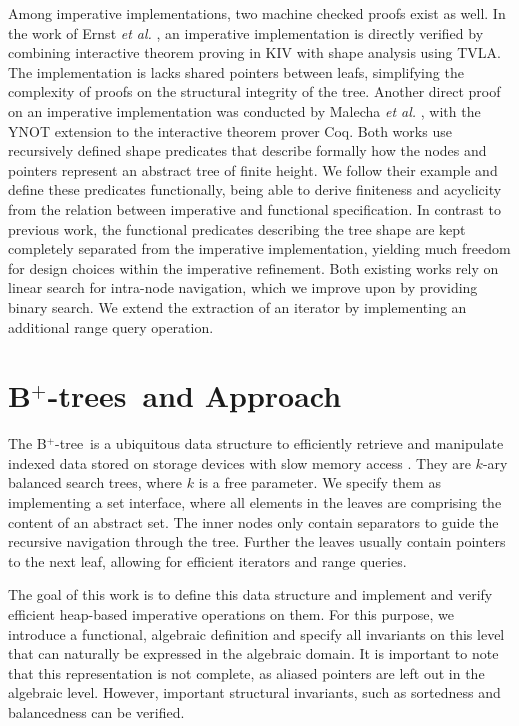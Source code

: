\documentclass[a4paper,UKenglish,cleveref, autoref, thm-restate]{lipics-v2021}
\newcommand{\btree}{B$^+$-tree}
\newcommand{\btrees}{B$^+$-trees}
\begin{document}
Among imperative implementations, two machine checked proofs exist as well.
In the work of Ernst \emph{et al.} \cite{DBLP:journals/sosym/ErnstSR15},
an imperative implementation is directly verified
by combining interactive theorem proving in KIV
with shape analysis using TVLA.
The implementation is lacks shared pointers between leafs,
simplifying the complexity of proofs on the structural integrity of the tree.
Another direct proof on an imperative implementation
was conducted by Malecha \emph{et al.} \cite{DBLP:conf/popl/MalechaMSW10}, with the YNOT
extension to the interactive theorem prover Coq.
Both works use recursively defined shape predicates
that describe formally how the nodes and pointers
represent an abstract tree of finite height.
We follow their example and define these predicates functionally,
being able to derive finiteness and acyclicity from the relation between imperative and functional specification.
In contrast to previous work, the functional predicates describing the tree shape are kept
completely separated from the imperative implementation,
yielding much freedom for design choices within the imperative refinement.
Both existing works rely on linear search for intra-node navigation,
which we improve upon by providing binary search.
We extend the extraction of an iterator
by implementing an additional range query operation. 


\section{\btrees\ and Approach}
\label{sec:approach}

The \btree\ is a ubiquitous data structure to efficiently retrieve and manipulate
indexed data stored on storage devices with slow memory access \cite{DBLP:journals/csur/Comer79}.
They are $k$-ary balanced search trees, where $k$ is a free parameter.
We specify them as implementing a set interface,
where all elements in the leaves are comprising the content of an abstract set.
The inner nodes only contain separators to guide the recursive navigation through the tree.
Further the leaves usually contain pointers
to the next leaf, allowing for efficient iterators and range queries.

The goal of this work is to define this data structure
and implement and verify efficient heap-based imperative operations on them.
For this purpose, we introduce a functional, algebraic definition and
specify all invariants on this level that can naturally be expressed in the algebraic domain.
It is important to note that this representation is not complete,
as aliased pointers are left out in the algebraic level.
However, important structural invariants, such as sortedness and balancedness
can be verified.
\end{document}

